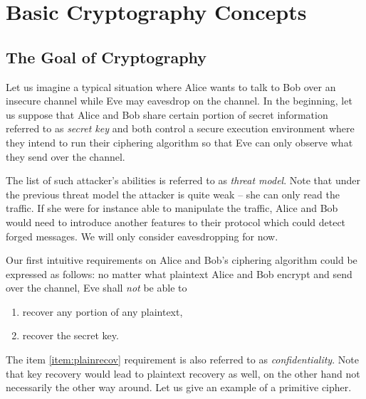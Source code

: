 \section{Basic Cryptography Concepts}
\label{sec:cryptobasics}

\subsection{The Goal of Cryptography}



Let us imagine a typical situation where Alice wants to talk to Bob over an insecure channel while Eve may eavesdrop on the channel. In the beginning, let us suppose that Alice and Bob share certain portion of secret information referred to as {\em secret key} and both control a secure execution environment where they intend to run their ciphering algorithm so that Eve can only observe what they send over the channel.

\begin{note}
	The list of such attacker's abilities is referred to as {\em threat model}. Note that under the previous threat model the attacker is quite weak -- she can only read the traffic. If she were for instance able to manipulate the traffic, Alice and Bob would need to introduce another features to their protocol which could detect forged messages. We will only consider eavesdropping for now.
\end{note}

Our first intuitive requirements on Alice and Bob's ciphering algorithm could be expressed as follows: no matter what plaintext Alice and Bob encrypt and send over the channel, Eve shall {\em not} be able to
\begin{enumerate}
	\item recover any portion of any plaintext, \label{item:plainrecov}
	\item recover the secret key. \label{item:keyrecov}
\end{enumerate}
The item \ref{item:plainrecov} requirement is also referred to as {\em confidentiality}. Note that key recovery would lead to plaintext recovery as well, on the other hand not necessarily the other way around. Let us give an example of a primitive cipher.

